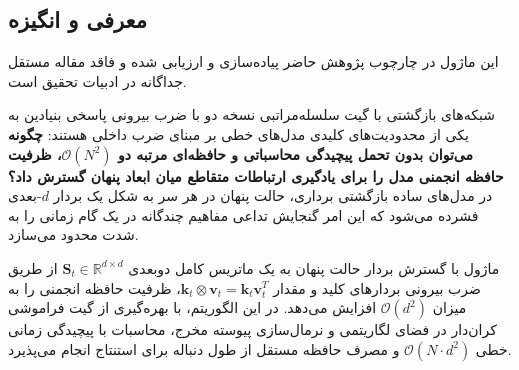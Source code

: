 \subsection{معرفی و انگیزه}
این ماژول در چارچوب پژوهش حاضر پیاده‌سازی و ارزیابی شده و فاقد مقاله مستقل جداگانه در ادبیات تحقیق است.

شبکه‌های بازگشتی با گیت سلسله‌مراتبی نسخه دو با ضرب بیرونی  پاسخی بنیادین به یکی از محدودیت‌های کلیدی مدل‌های خطی بر مبنای ضرب داخلی هستند: \textbf{چگونه می‌توان بدون تحمل پیچیدگی محاسباتی و حافظه‌ای مرتبه دو $\mathcal{O}(N^2)$، ظرفیت حافظه انجمنی مدل را برای یادگیری ارتباطات متقاطع میان ابعاد پنهان گسترش داد؟} در مدل‌های ساده بازگشتی برداری، حالت پنهان در هر سر به شکل یک بردار $d$-بعدی فشرده می‌شود که این امر گنجایش تداعی مفاهیم چندگانه در یک گام زمانی را به شدت محدود می‌سازد.

ماژول  با گسترش بردار حالت پنهان به یک ماتریس کامل دوبعدی $\mathbf{S}_t \in \mathbb{R}^{d \times d}$ از طریق ضرب بیرونی بردارهای کلید و مقدار $\mathbf{k}_t \otimes \mathbf{v}_t = \mathbf{k}_t \mathbf{v}_t^T$، ظرفیت حافظه انجمنی را به میزان $\mathcal{O}(d^2)$ افزایش می‌دهد. در این الگوریتم، با بهره‌گیری از گیت فراموشی کران‌دار در فضای لگاریتمی و نرمال‌سازی پیوسته مخرج، محاسبات با پیچیدگی زمانی خطی $\mathcal{O}(N \cdot d^2)$ و مصرف حافظه مستقل از طول دنباله برای استنتاج انجام می‌پذیرد.
